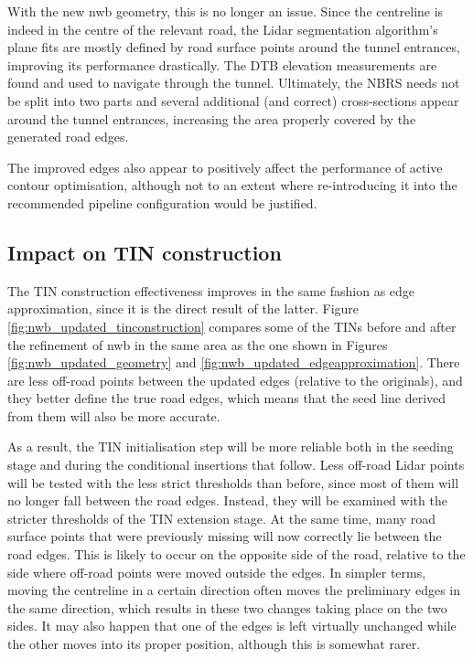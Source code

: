 With the new \ac{nwb} geometry, this is no longer an issue. Since the centreline is indeed in the centre of the relevant road, the Lidar segmentation algorithm's plane fits are mostly defined by road surface points around the tunnel entrances, improving its performance drastically. The DTB elevation measurements are found and used to navigate through the tunnel. Ultimately, the NBRS needs not be split into two parts and several additional (and correct) cross-sections appear around the tunnel entrances, increasing the area properly covered by the generated road edges.

The improved edges also appear to positively affect the performance of active contour optimisation, although not to an extent where re-introducing it into the recommended pipeline configuration would be justified.

\subsection{Impact on TIN construction}
\label{sub:nwb_updated_tinconstruction}

The TIN construction effectiveness improves in the same fashion as edge approximation, since it is the direct result of the latter. Figure \ref{fig:nwb_updated_tinconstruction} compares some of the TINs before and after the refinement of \ac{nwb} in the same area as the one shown in Figures \ref{fig:nwb_updated_geometry} and \ref{fig:nwb_updated_edgeapproximation}. There are less off-road points between the updated edges (relative to the originals), and they better define the true road edges, which means that the seed line derived from them will also be more accurate.

As a result, the TIN initialisation step will be more reliable both in the seeding stage and during the conditional insertions that follow. Less off-road Lidar points will be tested with the less strict thresholds than before, since most of them will no longer fall between the road edges. Instead, they will be examined with the stricter thresholds of the TIN extension stage. At the same time, many road surface points that were previously missing will now correctly lie between the road edges. This is likely to occur on the opposite side of the road, relative to the side where off-road points were moved outside the edges. In simpler terms, moving the centreline in a certain direction often moves the preliminary edges in the same direction, which results in these two changes taking place on the two sides. It may also happen that one of the edges is left virtually unchanged while the other moves into its proper position, although this is somewhat rarer.

